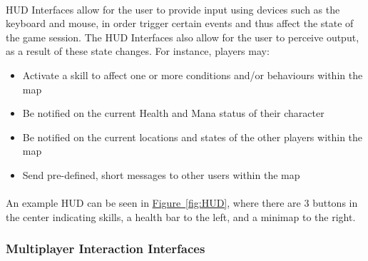\documentclass[12pt, titlepage]{article}
\begin{document}
\paragraph{}HUD Interfaces allow for the user to provide input using devices such as the keyboard and mouse, in order trigger certain events and thus affect the state of the game session. The HUD Interfaces also allow for the user to perceive output, as a result of these state changes. For instance, players may:
\begin{itemize}
    \item Activate a skill to affect one or more conditions and/or behaviours within the map
    \item Be notified on the current Health and Mana status of their character
    \item Be notified on the current locations and states of the other players within the map
    \item Send pre-defined, short messages to other users within the map
\end{itemize}
\paragraph{}An example HUD can be seen in \hyperref[fig:HUD]{Figure~\ref*{fig:HUD}}, where there are 3 buttons in the center indicating skills, a health bar to the left, and a minimap to the right.

\subsubsection{Multiplayer Interaction Interfaces}
\end{document}
